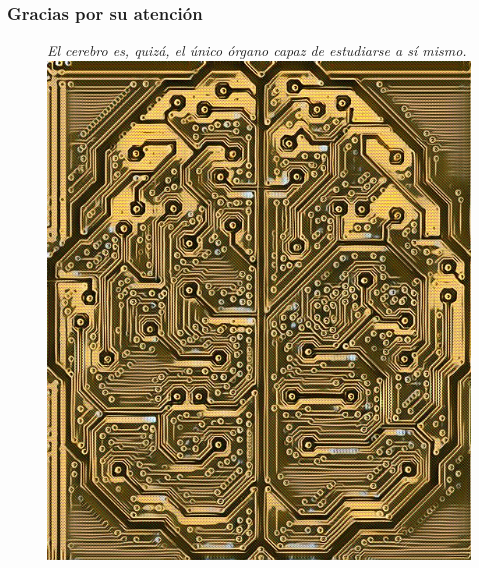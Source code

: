 \documentclass{beamer}
\begin{document}

%


%



\begin{frame}\frametitle{Gracias por su atenci\'on}
\begin{figure}
\centering
\textit{El cerebro es, quiz\'a, el \'unico \'organo capaz de estudiarse a s\'i mismo.}\\
\vspace*{2em}
\includegraphics[width=0.4\linewidth]{cerebot.jpg}
\end{figure}
\end{frame}

\end{document}
